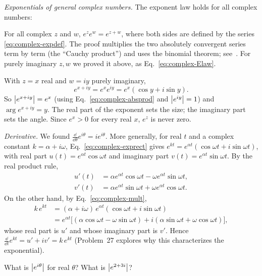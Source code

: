 \emph{Exponentials of general complex numbers.} The exponent law holds for all complex numbers:
\begin{beyond}
For all complex $z$ and $w$, $e^{z}e^{w}=e^{z+w}$, where both sides are defined by the series \eqref{eq:complex-expdef}. The proof multiplies the two absolutely convergent series term by term (the ``Cauchy product'') and uses the binomial theorem; see~\cite{rhb}. For purely imaginary $z,w$ we proved it above, as Eq.~\eqref{eq:complex-Elaw}.
\end{beyond}
With $z=x$ real and $w=iy$ purely imaginary,
\begin{equation}
e^{x+iy}=e^{x}e^{iy}=e^{x}(\cos y+i\sin y).\label{eq:complex-exprect}
\end{equation}
So $\left\lvert e^{x+iy}\right\rvert=e^{x}$ (using Eq.~\eqref{eq:complex-absprod} and $\left\lvert e^{iy}\right\rvert=1$) and $\arg e^{x+iy}=y$. The real part of the exponent sets the size; the imaginary part sets the angle. Since $e^x>0$ for every real $x$, $e^{z}$ is never zero.

\emph{Derivative.} We found $\frac{\dd}{\dd\theta}e^{i\theta}=ie^{i\theta}$. More generally, for real $t$ and a complex constant $k=\alpha+i\omega$, Eq.~\eqref{eq:complex-exprect} gives $e^{kt}=e^{\alpha t}(\cos\omega t+i\sin\omega t)$, with real part $u(t)=e^{\alpha t}\cos\omega t$ and imaginary part $v(t)=e^{\alpha t}\sin\omega t$. By the real product rule,
\begin{align*}
u'(t)&=\alpha e^{\alpha t}\cos\omega t-\omega e^{\alpha t}\sin\omega t,\\
v'(t)&=\alpha e^{\alpha t}\sin\omega t+\omega e^{\alpha t}\cos\omega t .
\end{align*}
On the other hand, by Eq.~\eqref{eq:complex-mult},
\begin{align*}
k\,e^{kt}&=(\alpha+i\omega)\,e^{\alpha t}(\cos\omega t+i\sin\omega t)\\
&=e^{\alpha t}\bigl[(\alpha\cos\omega t-\omega\sin\omega t)+i(\alpha\sin\omega t+\omega\cos\omega t)\bigr],
\end{align*}
whose real part is $u'$ and whose imaginary part is $v'$. Hence $\frac{\dd}{\dd t}e^{kt}=u'+iv'=k\,e^{kt}$ (Problem~27 explores why this characterizes the exponential).

\begin{checkpoint}
What is $\left\lvert e^{i\theta}\right\rvert$ for real $\theta$? What is $\left\lvert e^{2+3i}\right\rvert$?
\end{checkpoint}


